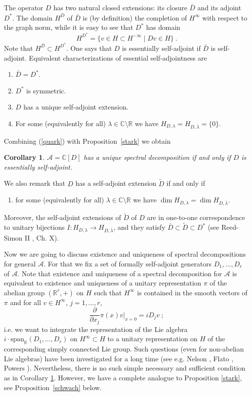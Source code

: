 \documentclass[10]{amsart}
\newtheorem{cor}[thm]{Corollary}
\theoremstyle{remark}
\theoremstyle{definition}
\numberwithin{equation}{section}
\newcommand{\R}{\mathbb{R}}           %
\newcommand{\C}{\mathbb{C}}           %
\newcommand{\Cal}{\mathcal}
\newcommand{\be}{\begin{equation}}
\begin{document}
{The operator $D$ has two natural closed extensions: its closure $\bar D$ and its adjoint $D^*$. The domain $H^{\bar D}$ of $\bar D$ is (by definition) the completion of $H^\infty$ with respect
to the graph norm, while it is easy to see that $D^*$ has domain
\be\label{lab} H^{D^*}=\{v\in H\subset H^{-\infty}\mid Dv\in H\}\ .\end{equation}
Note that $H^{\bar D}\subset  H^{D^*}$.
One says that $D$ is essentially self-adjoint if $\bar D$ is self-adjoint. Equivalent characterizations of essential self-adjointness are
\begin{enumerate}
\item $\bar D=D^*$.
\item $ D^*$ is symmetric.
\item \label{quark} $D$ has a unique self-adjoint extension.
\item For some (equivalently for all) $\lambda\in \C\setminus\R$ we have $H_{D,\lambda}=H_{D,\bar\lambda}=\{0\}$. 
\end{enumerate}
Combining (\ref{quark}) with Proposition~\ref{stark} we obtain

\begin{cor}\label{uwe} $\Cal A=\C[D]$ has a unique spectral decomposition if and only if $D$ is essentially self-adjoint.
\end{cor}

We also remark that $D$ has a self-adjoint extension $\tilde D$ if and only if
\begin{enumerate}
\item[(e)] for some (equivalently for all) $\lambda\in \C\setminus\R$ we have $\dim H_{D,\lambda}=\dim H_{D,\bar\lambda}$. 
\end{enumerate}
Moreover, the self-adjoint extensions of $\tilde D$ of $D$ are in one-to-one correspondence to unitary bijections $I: H_{D,\lambda}\rightarrow H_{D,\bar\lambda}$, and they
satisfy $\bar D\subset\tilde D\subset D^*$  (see  Reed-Simon II \cite{RSII}, Ch. X).

Now we are going to discuss existence and uniqueness of spectral decompositions for general $\Cal A$. For that we fix a set of formally self-adjoint generators $D_1,\dots,D_r$
of $\Cal A$. Note that existence and uniqueness of a spectral decomposition for $\Cal A$ is equivalent to existence and uniqueness of a unitary representation $\pi$ of the
abelian group $(\R^r,+)$ on $H$ such that $H^\infty$ is contained in the smooth vectors of $\pi$ and for all $v\in H^\infty$, $j=1,\dots, r$,
$$ \frac{\partial}{\partial x_j} \pi(x) v|_{x=0}={i} D_j v\ ;$$
i.e. we want to integrate the representation of the Lie algebra ${i}\cdot\mbox{span}_\R(D_1,\dots,D_r)$ on $H^\infty\subset H$ to a unitary representation on $H$ of the corresponding
simply connected Lie group. Such questions (even for non-abelian Lie algebras) have been investigated for a long time (see e.g. Nelson \cite{Nel59}, Flato \cite{FSSS72}, Powers \cite{Pow74}).
Nevertheless, there is no such simple necessary and sufficient condition as in Corollary \ref{uwe}. However, we have a complete analogue to Proposition \ref{stark},
see Proposition~\ref{schwach} below.

}
\end{document}
